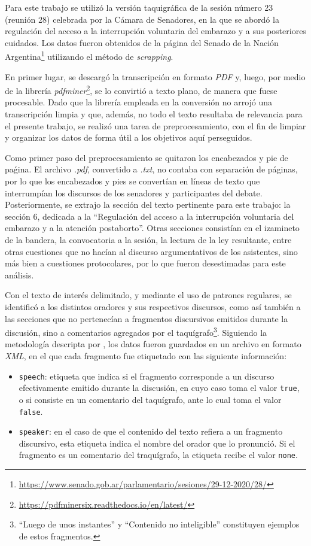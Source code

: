 Para este trabajo se utilizó la versión taquigráfica de la sesión número
23 (reunión 28) celebrada por la Cámara de Senadores, en la que se abordó la
regulación del acceso a la interrupción voluntaria del embarazo y a sus
posteriores cuidados. Los datos fueron obtenidos de la página del Senado de la Nación
Argentina\footnote{\url{https://www.senado.gob.ar/parlamentario/sesiones/29-12-2020/28/}}
utilizando el método de \textit{scrapping}.\par
En primer lugar, se descargó la transcripción en formato \textit{PDF} y, luego, por
medio de la librería \textit{pdfminer}\footnote{\url{https://pdfminersix.readthedocs.io/en/latest/}},
se lo convirtió a texto plano, de manera que fuese procesable. Dado que la librería
empleada en la conversión no arrojó una transcripción limpia y que, además, no todo el texto
resultaba de relevancia para el presente trabajo, se realizó una tarea de
preprocesamiento, con el fin de limpiar y organizar los datos de forma útil a los
objetivos aquí perseguidos.\par
Como primer paso del preprocesamiento se quitaron los encabezados y pie de paǵina.
El archivo \textit{.pdf}, convertido a \textit{.txt}, no contaba con separación de
páginas, por lo que los encabezados y pies se convertían en líneas de texto que
interrumpían los discursos de los senadores y participantes del debate.
Posteriormente, se extrajo la sección del texto pertinente para este trabajo:
la sección 6, dedicada a la ``Regulación  del  acceso  a  la  interrupción
voluntaria  del  embarazo  y  a  la atención postaborto''. Otras secciones consistían
en el izamineto de la bandera, la convocatoria a la sesión, la lectura de la ley
resultante, entre otras cuestiones que no hacían al discurso argumentativos de los
asistentes, sino más bien a cuestiones protocolares, por lo que fueron desestimadas
para este análisis.\par
Con el texto de interés delimitado, y mediante el uso de patrones regulares, se
identificó a los distintos oradores y sus respectivos discursos, como así también
a las secciones que no pertenecían a fragmentos discursivos emitidos durante la
discusión, sino a comentarios agregados por el taquígrafo\footnote{``Luego de unos
instantes'' y ``Contenido no inteligible'' constituyen ejemplos de estos
fragmentos.}. Siguiendo la metodología descripta por \cite{monroe2008fightin},
los datos fueron guardados en un archivo en formato \textit{XML}, en el que
cada fragmento fue etiquetado con las siguiente información:
\begin{itemize}
    \item \texttt{speech}: etiqueta que indica si el fragmento corresponde a un
    discurso efectivamente emitido durante la discusión, en cuyo caso toma el
    valor \texttt{true}, o si consiste en un comentario del taquígrafo, ante lo cual
    toma el valor \texttt{false}.
    \item \texttt{speaker}: en el caso de que el contenido del texto refiera a
    un fragmento discursivo, esta etiqueta indica el nombre del orador que lo
    pronunció. Si el fragmento es un comentario del traquígrafo, la etiqueta
    recibe el valor \texttt{none}.
\end{itemize}
